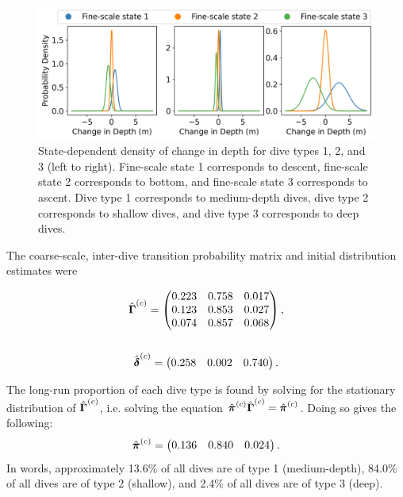 \documentclass[12pt]{article}
\begin{document}
\begin{figure}[h]
    \centering
    \includegraphics[width=6.5in]{../plt/emission_dists_K_3_3_nWhales_8.png}
    \caption{State-dependent density of change in depth for dive types 1, 2, and 3 (left to right). Fine-scale state 1 corresponds to descent, fine-scale state 2 corresponds to bottom, and fine-scale state 3 corresponds to ascent. Dive type 1 corresponds to medium-depth dives, dive type 2 corresponds to shallow dives, and dive type 3 corresponds to deep dives.}
    \label{fig:emission_dist}
\end{figure}

The coarse-scale, inter-dive transition probability matrix and initial distribution estimates were 

\begin{gather}
    \hat {\boldsymbol{\Gamma}}^{(c)} = 
    \begin{pmatrix} 
    0.223 & 0.758 & 0.017 \\
    0.123 & 0.853 & 0.027 \\
    0.074 & 0.857 & 0.068
    \end{pmatrix}, \\ \nonumber \\
    \hat {\boldsymbol{\delta}}^{(c)} = \begin{pmatrix} 0.258 & 0.002 & 0.740 \end{pmatrix}.
\end{gather}

The long-run proportion of each dive type is found by solving for the stationary distribution of $\hat {\boldsymbol{\Gamma}}^{(c)}$, i.e. solving the equation $\hat {\boldsymbol{\pi}}^{(c)} \hat {\boldsymbol{\Gamma}}^{(c)} = \hat {\boldsymbol{\pi}}^{(c)}$. Doing so gives the following:
%
\begin{equation}
    \hat {\boldsymbol{\pi}}^{(c)} = 
    \begin{pmatrix}
        0.136 & 0.840 & 0.024
    \end{pmatrix}.
\end{equation}
%
In words, approximately 13.6\% of all dives are of type 1 (medium-depth), 84.0\% of all dives are of type 2 (shallow), and 2.4\% of all dives are of type 3 (deep).
\end{document}
